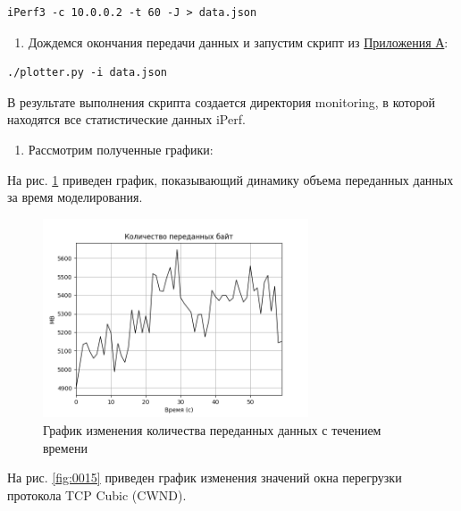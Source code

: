 \documentclass[
  13pt,
  fontsize=13pt,
  russian,
  a4paper,
,captions=tableheading
]{scrreprt}
\providecommand{\tightlist}{%
  \setlength{\itemsep}{0pt}\setlength{\parskip}{0pt}}
\begin{document}
\begin{verbatim}
iPerf3 -c 10.0.0.2 -t 60 -J > data.json
\end{verbatim}

\begin{enumerate}
\def\labelenumi{\arabic{enumi}.}
\setcounter{enumi}{3}
\tightlist
\item
  Дождемся окончания передачи данных и запустим скрипт из
  \protect\hyperlink{appendix1}{Приложения А}:
\end{enumerate}

\begin{verbatim}
./plotter.py -i data.json
\end{verbatim}

В результате выполнения скрипта создается директория monitoring, в
которой находятся все статистические данных iPerf.

\begin{enumerate}
\def\labelenumi{\arabic{enumi}.}
\setcounter{enumi}{4}
\tightlist
\item
  Рассмотрим полученные графики:
\end{enumerate}

На рис. \ref{fig:0014} приведен график, показывающий динамику объема
переданных данных за время моделирования.

\begin{figure}
\hypertarget{fig:0014}{%
\centering
\includegraphics[width=0.7\textwidth,height=\textheight]{iperf_bytes.png}
\caption{График изменения количества переданных данных с течением
времени}\label{fig:0014}
}
\end{figure}

На рис. \ref{fig:0015} приведен график изменения значений окна
перегрузки протокола TCP Cubic (CWND).
\end{document}

